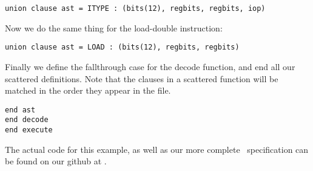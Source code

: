 \begin{lstlisting}
union clause ast = ITYPE : (bits(12), regbits, regbits, iop)
\end{lstlisting}


\noindent Now we do the same thing for the load-double instruction:

\begin{lstlisting}
union clause ast = LOAD : (bits(12), regbits, regbits)
\end{lstlisting}


Finally we define the fallthrough case for the decode function, and
end all our scattered definitions. Note that the clauses in a
scattered function will be matched in the order they appear in the
file.


\begin{lstlisting}
end ast
end decode
end execute
\end{lstlisting}

The actual code for this example, as well as our more complete
\riscv\ specification can be found on our github at
.
